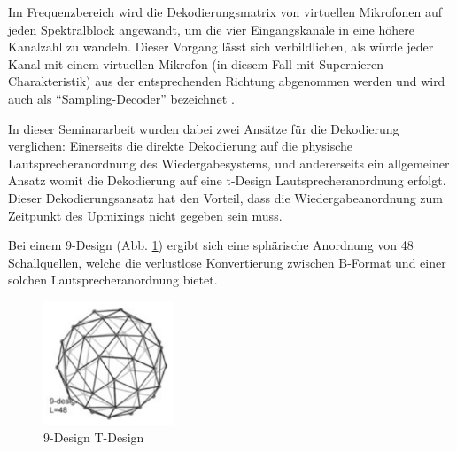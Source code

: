 


Im Frequenzbereich wird die Dekodierungsmatrix von virtuellen Mikrofonen auf jeden Spektralblock angewandt, um die vier Eingangskanäle in eine höhere Kanalzahl zu wandeln. Dieser Vorgang lässt sich verbildlichen, als würde jeder Kanal mit einem virtuellen Mikrofon (in diesem Fall mit Supernieren-Charakteristik) aus der entsprechenden Richtung abgenommen werden und wird auch als ``Sampling-Decoder'' bezeichnet \cite{ambi-book}.

In dieser Seminararbeit wurden dabei zwei Ansätze für die Dekodierung verglichen: Einerseits die direkte Dekodierung auf die physische Lautsprecheranordnung des Wiedergabesystems, und andererseits ein allgemeiner Ansatz womit die Dekodierung auf eine t-Design Lautsprecheranordnung erfolgt. Dieser Dekodierungsansatz hat den Vorteil, dass die Wiedergabeanordnung zum Zeitpunkt des Upmixings nicht gegeben sein muss.

Bei einem 9-Design (Abb. \ref{fig:tdesign_image}) ergibt sich eine sphärische Anordnung von 48 Schallquellen, welche die verlustlose Konvertierung zwischen B-Format und einer solchen Lautsprecheranordnung bietet.

\begin{figure}[!ht]
  \centering
  \includegraphics[width=0.35\textwidth]{implementierung/plots/t-design.png}
  \caption{9-Design T-Design \cite{ambi-book}}
  \label{fig:tdesign_image}
\end{figure}

